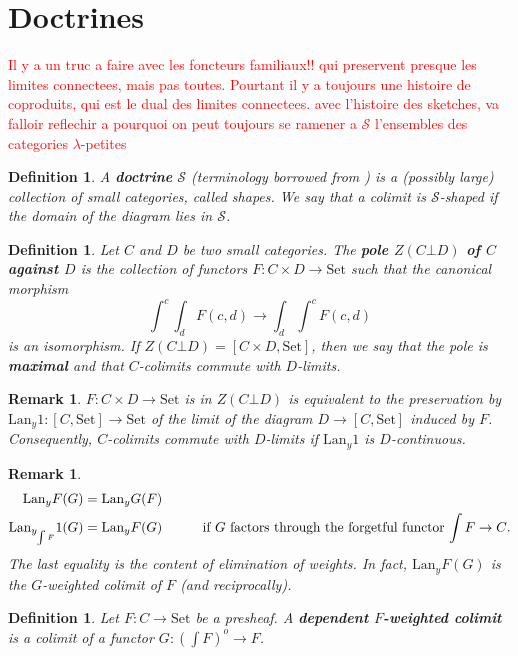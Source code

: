 \documentclass{article}
\newcommand{\Lan}{\text{Lan}}
\newcommand{\Set}{\text{Set}}
\newtheorem{definition}[theorem]{Definition}
\newtheorem{remark}[theorem]{Remark}
\begin{document}
\section{Doctrines}
\textcolor{red}{Il y a un truc a faire avec les foncteurs familiaux!! qui
  preservent presque les limites connectees, mais pas toutes. Pourtant il y a
  toujours une histoire de coproduits, qui est le dual des limites connectees.}
\textcolor{red}{avec l'histoire des sketches, va falloir reflechir a pourquoi on
  peut toujours se ramener a $\mathcal{S}$ l'ensembles des categories $\lambda$-petites}
\begin{definition}
  A \textbf{doctrine} $\mathcal{S}$ (terminology borrowed from \cite{lack_accessible}) is
  a (possibly large) collection of small categories, called shapes.
  We say that a colimit is $\mathcal{S}$-shaped if
  the domain of the diagram lies in $\mathcal{S}$.
\end{definition}
\begin{definition}
 Let $C$ and $D$ be two small categories. The \textbf{pole $Z(C\bot D)$ of $C$ against
   $D$} is the collection of functors $F:C\times D \rightarrow \Set$ such that
 the canonical morphism
 \[
   \int^c \int_d F(c,d)
   \rightarrow  \int_d \int^c F(c,d)
 \]
 is an isomorphism.
 If $Z(C\bot D) = [C\times D, \Set]$, then we say that the pole is
 \textbf{maximal} and that $C$-colimits commute with $D$-limits.
\end{definition}
\begin{remark}
  $F : C \times D \rightarrow \Set$ is in $Z(C\bot D)$ is equivalent to the
  preservation by $\Lan_y 1 : [C,\Set] \rightarrow \Set$ of the limit of the diagram
  $D \rightarrow [C, \Set]$ induced by $F$.
  Consequently, $C$-colimits commute with $D$-limits if $\Lan_y 1$ is $D$-continuous.
\end{remark}
\begin{remark}
  \begin{align*}
    \Lan_yF(G)=\Lan_yG(F) &&\\ 
    \Lan_{y_{\int F}} 1(G) = \Lan_y F(G) &&\text{\qquad if $G$ factors through the
      forgetful functor $\int F \rightarrow C$.}
    \end{align*}
    The last equality is the content of elimination of weights.
    In fact, $\Lan_y F(G)$ is the $G$-weighted colimit of $F$ (and reciprocally).
\end{remark}
\begin{definition}
 Let $F : C \rightarrow \Set$ be a presheaf. A \textbf{dependent $F$-weighted
   colimit} is a colimit of a functor $G: (\int F)^o \rightarrow F$.
\end{definition}
\end{document}
